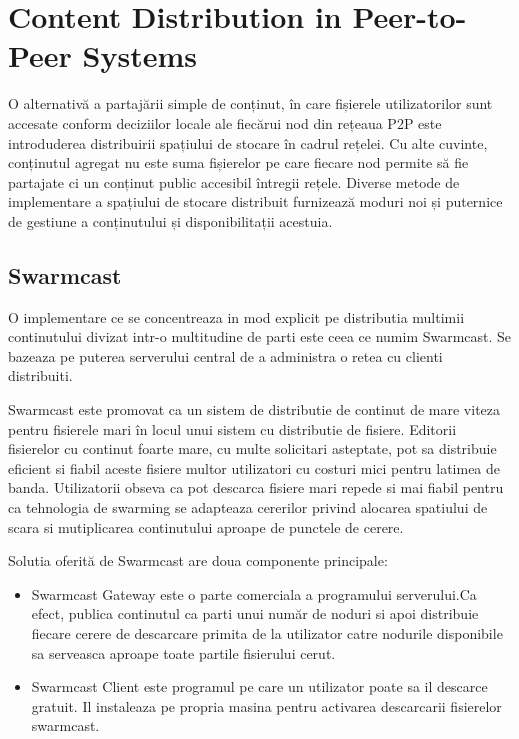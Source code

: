 \section{Content Distribution in Peer-to-Peer Systems}
\label{sec:p2p-systems:streaming}

O alternativă a partajării simple de conținut, în care fișierele
utilizatorilor sunt accesate conform deciziilor locale ale fiecărui nod din
rețeaua P2P este introduderea distribuirii spațiului de stocare în cadrul
rețelei. Cu alte cuvinte, conținutul agregat nu este suma fișierelor pe care
fiecare nod permite să fie partajate ci un conținut public accesibil întregii
rețele. Diverse metode de implementare a spațiului de stocare distribuit
furnizează moduri noi și puternice de gestiune a conținutului și
disponibilitații acestuia.

\subsection{Swarmcast}

O implementare ce se concentreaza in mod explicit pe distributia multimii
continutului divizat intr-o multitudine de parti este ceea ce numim Swarmcast.
Se bazeaza pe puterea serverului central de a administra o retea cu clienti
distribuiti.

Swarmcast este promovat ca un sistem de distributie de continut de mare viteza
pentru fisierele mari în locul unui sistem cu distributie de fisiere. Editorii
fisierelor cu continut foarte mare, cu multe solicitari asteptate, pot sa
distribuie eficient si fiabil aceste fisiere multor utilizatori cu costuri
mici pentru latimea de banda. Utilizatorii obseva ca pot descarca fisiere mari
repede si mai fiabil pentru ca tehnologia de swarming se adapteaza cererilor
privind alocarea spatiului de scara si mutiplicarea continutului aproape de
punctele de cerere.

Solutia oferită de Swarmcast are doua componente principale:

\begin{itemize}
  \item{Swarmcast Gateway este o parte comerciala a programului serverului.Ca
  efect, publica continutul ca parti unui număr de noduri si apoi distribuie
  fiecare cerere de descarcare primita de la utilizator catre nodurile
  disponibile sa serveasca aproape toate partile fisierului cerut.}
  \item{Swarmcast Client este programul pe care un utilizator poate sa il
  descarce gratuit. Il instaleaza pe propria masina pentru activarea
  descarcarii fisierelor swarmcast.}
\end{itemize}

